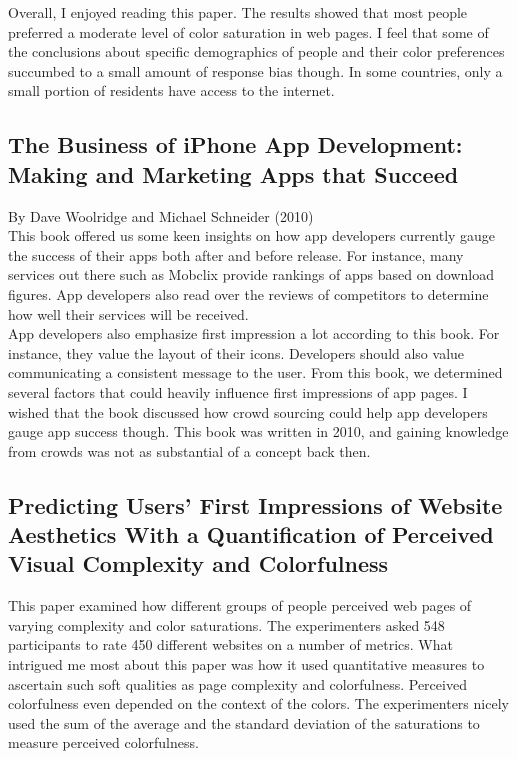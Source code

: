 \documentclass{article}
\begin{document}
Overall, I enjoyed reading this paper. The results showed that most people preferred a moderate level of color saturation in web pages. I feel that some of the conclusions about specific demographics of people and their color preferences succumbed to a small amount of response bias though. In some countries, only a small portion of residents have access to the internet.

\subsection{The Business of iPhone App Development: Making and Marketing Apps that Succeed}

By Dave Woolridge and Michael Schneider (2010) \\

This book offered us some keen insights on how app developers currently gauge the success of their apps both after and before release. For instance, many services out there such as Mobclix provide rankings of apps based on download figures. App developers also read over the reviews of competitors to determine how well their services will be received. \\

App developers also emphasize first impression a lot according to this book. For instance, they value the layout of their icons. Developers should also value communicating a consistent message to the user. From this book, we determined several factors that could heavily influence first impressions of app pages. I wished that the book discussed how crowd sourcing could help app developers gauge app success though. This book was written in 2010, and gaining knowledge from crowds was not as substantial of a concept back then.

\subsection{Predicting Users’ First Impressions of Website Aesthetics With a Quantiﬁcation of Perceived Visual Complexity and Colorfulness}

This paper examined how different groups of people perceived web pages of varying complexity and color saturations. The experimenters asked 548 participants to rate 450 different websites on a number of metrics. What intrigued me most about this paper was how it used quantitative measures to ascertain such soft qualities as page complexity and colorfulness. Perceived colorfulness even depended on the context of the colors. The experimenters nicely used the sum of the average and the standard deviation of the saturations to measure perceived colorfulness. \\
\end{document}

